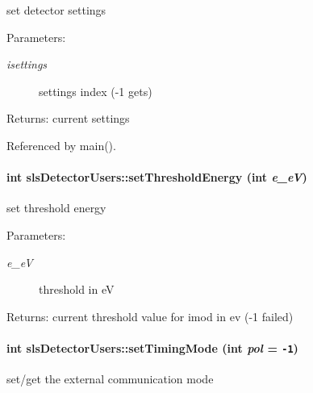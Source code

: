set detector settings 

\begin{Desc}
\item[Parameters:]
\begin{description}
\item[{\em isettings}]settings index (-1 gets) \end{description}
\end{Desc}
\begin{Desc}
\item[Returns:]current settings \end{Desc}


Referenced by main().\hypertarget{classslsDetectorUsers_1354266fd1bfaccd58992a3f51bbbd1d}{
\paragraph[setThresholdEnergy]{\setlength{\rightskip}{0pt plus 5cm}int sls\-Detector\-Users::set\-Threshold\-Energy (int {\em e\_\-e\-V})}\hfill}
\label{classslsDetectorUsers_1354266fd1bfaccd58992a3f51bbbd1d}


set threshold energy 

\begin{Desc}
\item[Parameters:]
\begin{description}
\item[{\em e\_\-e\-V}]threshold in e\-V \end{description}
\end{Desc}
\begin{Desc}
\item[Returns:]current threshold value for imod in ev (-1 failed) \end{Desc}
\hypertarget{classslsDetectorUsers_e2825524756c4bdf418a6233e137b4d7}{
\paragraph[setTimingMode]{\setlength{\rightskip}{0pt plus 5cm}int sls\-Detector\-Users::set\-Timing\-Mode (int {\em pol} = {\tt -1})}\hfill}
\label{classslsDetectorUsers_e2825524756c4bdf418a6233e137b4d7}


set/get the external communication mode 


